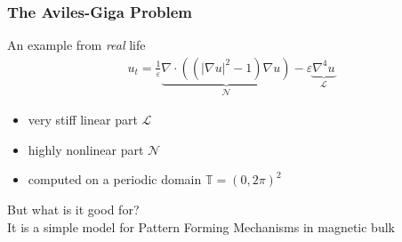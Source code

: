 \documentclass[%
  english,
  hyperref={pdfpagelabels=false},
  aspectratio=1610]{beamer}
\begin{document}
\begin{frame}
  \frametitle{The Aviles-Giga Problem}
  An example from \emph{real} life
\begin{align*}
  u_t = \frac{1}{\varepsilon} \underbrace{\nabla \cdot \left( \left( \lvert \nabla u \rvert^2 - 1 \right)\nabla u \right)}_{\mathcal{N}} 
  - \varepsilon \underbrace{\nabla^4 u}_{\mathcal{L}}
\end{align*}
\pause
\begin{itemize}
  \item very stiff linear part $\mathcal{L}$
  \item highly nonlinear part $\mathcal{N}$
  \item computed on a periodic domain $\mathbb{T} = \left( 0, 2 \pi \right)^2$
\end{itemize}
\vspace{1.5em} 
\pause
But what is it good for?\\[1.5em]
\pause
It is a simple model for Pattern Forming Mechanisms in magnetic bulk

\end{frame}
\end{document}
